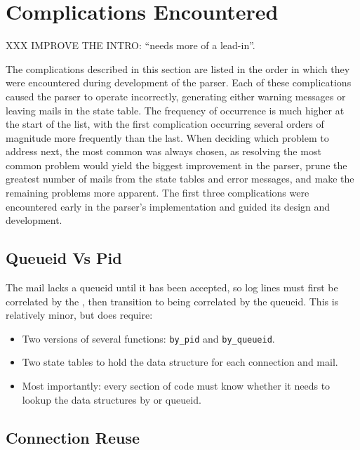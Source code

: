 \section{Complications Encountered}

\label{complications}

XXX IMPROVE THE INTRO\@: ``needs more of a lead-in''.

The complications described in this section are listed in the order in
which they were encountered during development of the parser.  Each of
these complications caused the parser to operate incorrectly, generating
either warning messages or leaving mails in the state table.  The frequency
of occurrence is much higher at the start of the list, with the first
complication occurring several orders of magnitude more frequently than the
last.  When deciding which problem to address next, the most common was
always chosen, as resolving the most common problem would yield the biggest
improvement in the parser, prune the greatest number of mails from the
state tables and error messages, and make the remaining problems more
apparent.  The first three complications were encountered early in the
parser's implementation and guided its design and development.

\subsection{Queueid Vs Pid}

The mail lacks a queueid until it has been accepted, so log lines must
first be correlated by the  , then transition to
being correlated by the queueid.  This is relatively minor, but does
require:

\begin{itemize}

    \item Two versions of several functions: \texttt{by\_pid} and
        \texttt{by\_queueid}.

    \item Two state tables to hold the data structure for each connection
        and mail.

    \item Most importantly: every section of code must know whether it
        needs to lookup the data structures by  or queueid.

\end{itemize}

\subsection{Connection Reuse}

